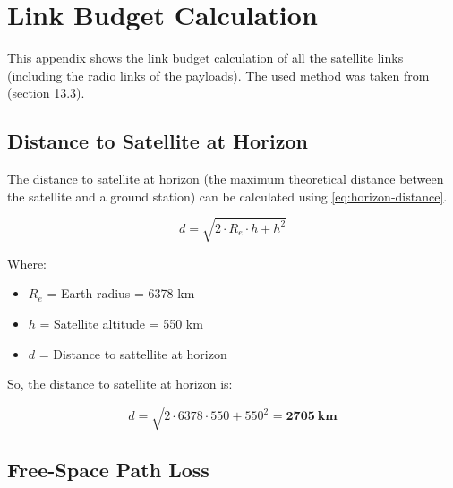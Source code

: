 %
%
%
%
%

%
%
%
%
%
%

\chapter{Link Budget Calculation} \label{anx:link-budget}

This appendix shows the link budget calculation of all the satellite links (including the radio links of the payloads). The used method was taken from \cite{larson2005} (section 13.3).

\section{Distance to Satellite at Horizon}

The distance to satellite at horizon (the maximum theoretical distance between the satellite and a ground station) can be calculated using \autoref{eq:horizon-distance}.

\begin{equation} \label{eq:horizon-distance}
d = \sqrt{2\cdot R_{e}\cdot h + h^{2}}
\end{equation}

Where:

\begin{itemize}
    \item $R_{e}$ = Earth radius = 6378 km
    \item $h$ = Satellite altitude = 550 km
    \item $d$ = Distance to sattellite at horizon
\end{itemize}

So, the distance to satellite at horizon is:

\begin{equation} \label{eq:horizon-distance-result}
d = \sqrt{2\cdot 6378\cdot 550 + 550^{2}} = \mathbf{2705\ km}
\end{equation}

\section{Free-Space Path Loss}

